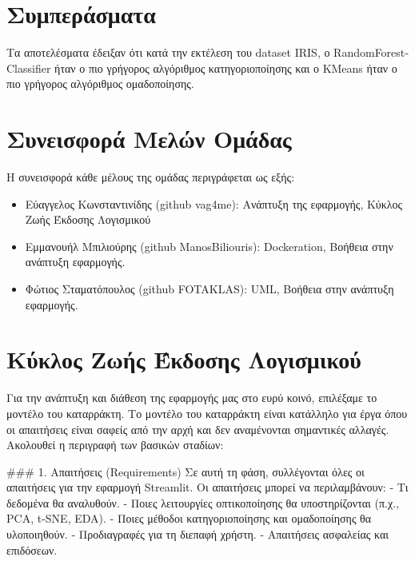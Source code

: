\documentclass[a4paper,12pt]{article}
\begin{document}
\section{Συμπεράσματα}
\label{sec:conclusion}


Τα αποτελέσματα έδειξαν ότι κατά την εκτέλεση του dataset \textlatin{IRIS}, ο \textlatin{RandomForestClassifier} ήταν ο πιο γρήγορος αλγόριθμος κατηγοριοποίησης και ο \textlatin{KMeans} ήταν ο πιο γρήγορος αλγόριθμος ομαδοποίησης.

\section{Συνεισφορά Μελών Ομάδας}
\label{sec:contribution}
Η συνεισφορά κάθε μέλους της ομάδας περιγράφεται ως εξής:
\begin{itemize}
    \item Εύαγγελος Κωνσταντινίδης \textlatin{(github vag4me)}: Ανάπτυξη της εφαρμογής, Κύκλος Ζωής Έκδοσης Λογισμικού
    \item Εμμανουήλ Μπιλιούρης \textlatin{(github ManosBiliouris)}: \textlatin{Dockeration}, Βοήθεια στην ανάπτυξη εφαρμογής.
    \item Φώτιος Σταματόπουλος \textlatin{(github FOTAKLAS)}: \textlatin{UML}, Βοήθεια στην ανάπτυξη εφαρμογής.
\end{itemize}

\section{Κύκλος Ζωής Έκδοσης Λογισμικού}
\label{sec:software_lifecycle}
Για την ανάπτυξη και διάθεση της εφαρμογής μας στο ευρύ κοινό, επιλέξαμε το μοντέλο του καταρράκτη. Το μοντέλο του καταρράκτη είναι κατάλληλο για έργα όπου οι απαιτήσεις είναι σαφείς από την αρχή και δεν αναμένονται σημαντικές αλλαγές. Ακολουθεί η περιγραφή των βασικών σταδίων:

### 1. Απαιτήσεις (\textlatin{Requirements})
Σε αυτή τη φάση, συλλέγονται όλες οι απαιτήσεις για την εφαρμογή \textlatin{Streamlit}. Οι απαιτήσεις μπορεί να περιλαμβάνουν:
- Τι δεδομένα θα αναλυθούν.
- Ποιες λειτουργίες οπτικοποίησης θα υποστηρίζονται (π.χ., \textlatin{PCA}, \textlatin{t-SNE}, \textlatin{EDA}).
- Ποιες μέθοδοι κατηγοριοποίησης και ομαδοποίησης θα υλοποιηθούν.
- Προδιαγραφές για τη διεπαφή χρήστη.
- Απαιτήσεις ασφαλείας και επιδόσεων.



\par\vspace{10pt}
\end{document}
